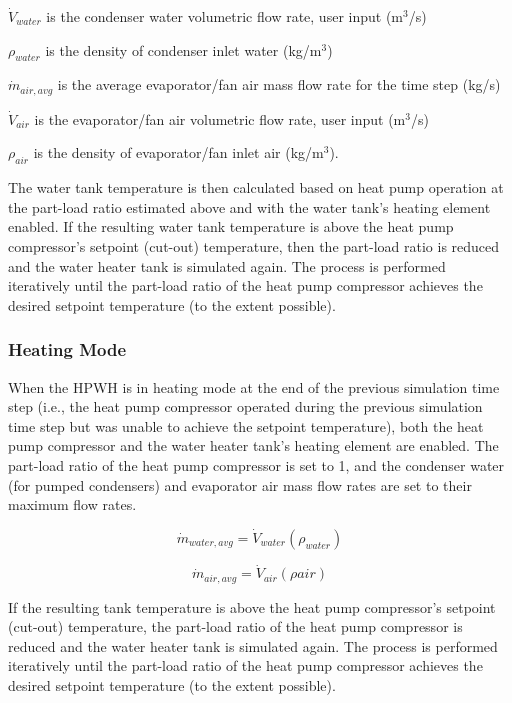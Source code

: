 \({\dot V_{water}}\) is the condenser water volumetric flow rate, user input (m\(^{3}\)/s)

\({\rho_{water}}\) is the density of condenser inlet water (kg/m\(^{3}\))

\({\dot m_{air,avg}}\) is the average evaporator/fan air mass flow rate for the time step (kg/s)

\({\dot V_{air}}\) is the evaporator/fan air volumetric flow rate, user input (m\(^{3}\)/s)

\({\rho_{air}}\) is the density of evaporator/fan inlet air (kg/m\(^{3}\)).

The water tank temperature is then calculated based on heat pump operation at the part-load ratio estimated above and with the water tank's heating element enabled. If the resulting water tank temperature is above the heat pump compressor's setpoint (cut-out) temperature, then the part-load ratio is reduced and the water heater tank is simulated again. The process is performed iteratively until the part-load ratio of the heat pump compressor achieves the desired setpoint temperature (to the extent possible).

\subsubsection{Heating Mode}\label{heating-mode-000}

When the HPWH is in heating mode at the end of the previous simulation time step (i.e., the heat pump compressor operated during the previous simulation time step but was unable to achieve the setpoint temperature), both the heat pump compressor and the water heater tank's heating element are enabled. The part-load ratio of the heat pump compressor is set to 1, and the condenser water (for pumped condensers) and evaporator air mass flow rates are set to their maximum flow rates.

\begin{equation}
{\dot m_{water,avg}} = {\dot V_{water}}\left( {{\rho_{water}}} \right)
\end{equation}

\begin{equation}
{\dot m_{air,avg}} = {\dot V_{air}}\left( {\rho air} \right)
\end{equation}

If the resulting tank temperature is above the heat pump compressor's setpoint (cut-out) temperature, the part-load ratio of the heat pump compressor is reduced and the water heater tank is simulated again. The process is performed iteratively until the part-load ratio of the heat pump compressor achieves the desired setpoint temperature (to the extent possible).


